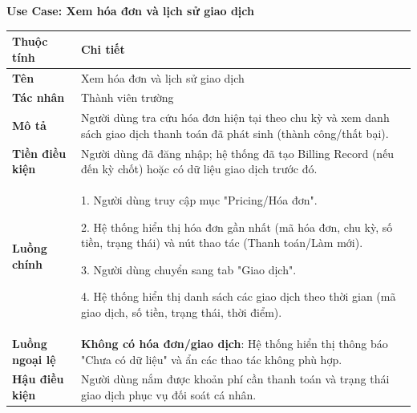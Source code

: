 \noindent \textbf{Use Case: Xem hóa đơn và lịch sử giao dịch} \\
\renewcommand{\arraystretch}{1.6}
\begin{xltabular}{\textwidth}{|l|X|}
\hline
\textbf{Thuộc tính} & \textbf{Chi tiết} \\
\hline
\textbf{Tên} & Xem hóa đơn và lịch sử giao dịch \\
\hline
\textbf{Tác nhân} & Thành viên trường \\
\hline
\textbf{Mô tả} & Người dùng tra cứu hóa đơn hiện tại theo chu kỳ và xem danh sách giao dịch thanh toán đã phát sinh (thành công/thất bại). \\
\hline
\textbf{Tiền điều kiện} & Người dùng đã đăng nhập; hệ thống đã tạo Billing Record (nếu đến kỳ chốt) hoặc có dữ liệu giao dịch trước đó. \\
\hline
\textbf{Luồng chính} &
1. Người dùng truy cập mục "Pricing/Hóa đơn".

2. Hệ thống hiển thị hóa đơn gần nhất (mã hóa đơn, chu kỳ, số tiền, trạng thái) và nút thao tác (Thanh toán/Làm mới).

3. Người dùng chuyển sang tab "Giao dịch".

4. Hệ thống hiển thị danh sách các giao dịch theo thời gian (mã giao dịch, số tiền, trạng thái, thời điểm).
\\
\hline

\textbf{Luồng ngoại lệ} &
\textbf{Không có hóa đơn/giao dịch}: Hệ thống hiển thị thông báo "Chưa có dữ liệu" và ẩn các thao tác không phù hợp.
\\
\hline

\textbf{Hậu điều kiện} & Người dùng nắm được khoản phí cần thanh toán và trạng thái giao dịch phục vụ đối soát cá nhân.\\
\hline
\end{xltabular}

